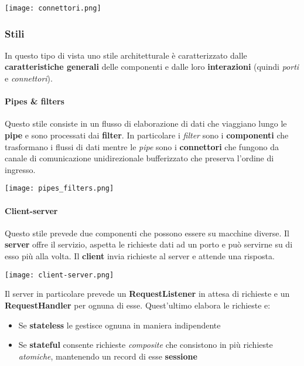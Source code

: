 \begin{center}
	\texttt{[image: connettori.png]}
\end{center}

\subsubsection{Stili}
In questo tipo di vista uno stile architetturale è caratterizzato dalle \textbf{caratteristiche generali} delle componenti e dalle loro \textbf{interazioni} (quindi \textit{porti} e \textit{connettori}).

\paragraph{Pipes \& filters} Questo stile consiste in un flusso di elaborazione di dati che viaggiano lungo le \textbf{pipe} e sono processati dai \textbf{filter}. In particolare i \textit{filter} sono i \textbf{componenti} che trasformano i flussi di dati mentre le \textit{pipe} sono i \textbf{connettori} che fungono da canale di comunicazione unidirezionale bufferizzato che preserva l'ordine di ingresso.
\begin{center}
	\texttt{[image: pipes\_filters.png]}
\end{center}

\paragraph{Client-server} Questo stile prevede due componenti che possono essere su macchine diverse. Il \textbf{server} offre il servizio, aspetta le richieste dati ad un porto e può servirne su di esso più alla volta. Il \textbf{client} invia richieste al server e attende una risposta.
\begin{center}
	\texttt{[image: client-server.png]}
\end{center}
Il server in particolare prevede un \textbf{RequestListener} in attesa di richieste e un \textbf{RequestHandler} per ognuna di esse. Quest'ultimo elabora le richieste e:
\begin{itemize}
	\item Se \textbf{stateless} le gestisce ognuna in maniera indipendente
	\item Se \textbf{stateful} consente richieste \textit{composite} che consistono in più richieste \textit{atomiche}, mantenendo un record di esse \textbf{sessione}
\end{itemize}

